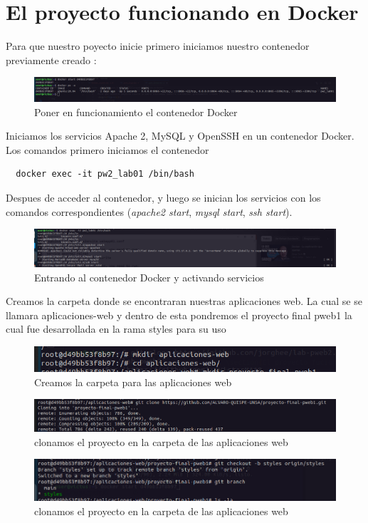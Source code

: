 \section{El proyecto funcionando en Docker}
Para que nuestro poyecto inicie primero iniciamos nuestro contenedor previamente creado :
\begin{figure}[H]
  \centering
  \includegraphics[width=1.0\textwidth]{img/Iniciando_Docker.png}
  \caption{Poner en funcionamiento el contenedor Docker}
\end{figure}
Iniciamos los servicios Apache 2, MySQL y OpenSSH en un contenedor Docker. Los comandos primero iniciamos el contenedor 
\begin{verbatim}
  docker exec -it pw2_lab01 /bin/bash 
\end{verbatim}
\hspace{0.5cm}Despues de acceder al contenedor, y luego se inician los servicios con los comandos correspondientes 
(\textit{apache2 start}, \textit{mysql start}, \textit{ssh start}).
\begin{figure}[H]
  \centering
  \includegraphics[width=1.0\textwidth]{img/Activamos_servicios.png}
  \caption{Entrando al contenedor Docker y activando servicios}
\end{figure}


Creamos la carpeta donde se encontraran nuestras aplicaciones web. La cual se se llamara aplicaciones-web y dentro de esta pondremos el 
proyecto final pweb1 la cual fue desarrollada en la rama styles para su uso 
\begin{figure}[H]
  \centering
  \includegraphics[width=1.0\textwidth]{img/Creamos_carpeta.png}
  \caption{Creamos la carpeta para las aplicaciones web}
\end{figure}
\begin{figure}[H]
  \centering
  \includegraphics[width=1.0\textwidth]{img/Clonamos_proyecto.png}
  \caption{clonamos el proyecto en la carpeta de las aplicaciones web}
\end{figure}
\begin{figure}[H]
  \centering
  \includegraphics[width=1.0\textwidth]{img/Cambiando_Rama.png}
  \caption{clonamos el proyecto en la carpeta de las aplicaciones web}
\end{figure}


